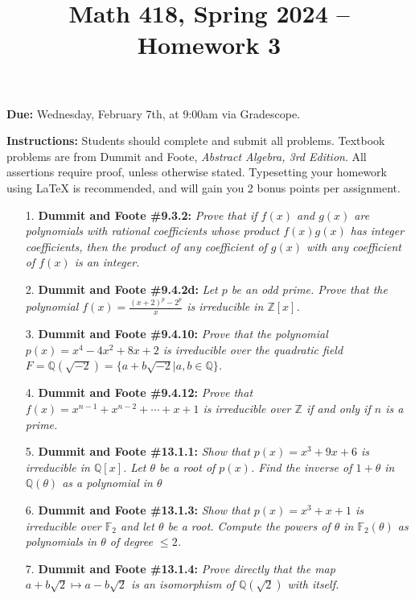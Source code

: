 \documentclass[12pt]{article}
\title{Math 418, Spring 2024 -- Homework 3}
\date{}
\newcommand{\Z}{\mathbb{Z}}
\newcommand{\Q}{\mathbb{Q}}
\newcommand{\F}{\mathbb{F}}
\begin{document}
 \maketitle
\vspace{-80pt}

\textbf{Due:} Wednesday, February 7th, at 9:00am via Gradescope.

\textbf{Instructions:} Students should complete and submit all problems. Textbook problems are from Dummit and Foote, \emph{Abstract Algebra, 3rd Edition}. All assertions require proof, unless otherwise stated. Typesetting your homework using LaTeX is recommended, and will gain you 2 bonus points per assignment.

\begin{enumerate}

\item[1.] \textbf{Dummit and Foote \#9.3.2:} \textit{Prove that if $f(x)$ and $g(x)$ are polynomials with rational coefficients whose product $f(x)g(x)$ has integer coefficients, then the product of any coefficient of $g(x)$ with any coefficient of $f(x)$ is an integer.}

\item[2.] \textbf{Dummit and Foote \#9.4.2d:} \textit{Let $p$ be an odd prime. Prove that the polynomial $f(x) = \frac{(x+2)^p - 2^p}{x}$ is irreducible in $\Z[x]$.}

\item[3.] \textbf{Dummit and Foote \#9.4.10:} \textit{Prove that the polynomial $p(x) = x^4 - 4x^2 + 8x + 2$ is irreducible over the quadratic field $F = \Q(\sqrt{-2}) = \{a + b\sqrt{-2} | a, b \in \Q\}$.}

\item[4.] \textbf{Dummit and Foote \#9.4.12:} \textit{Prove that $f(x) = x^{n-1} + x^{n-2} + \cdots + x + 1$ is irreducible over $\Z$ if and only if $n$ is a prime.}

\item[5.] \textbf{Dummit and Foote \#13.1.1:} \textit{Show that $p(x) = x^3 + 9x +6$ is irreducible in $\Q[x]$. Let $\theta$ be a root of $p(x)$. Find the inverse of $1+\theta$ in $\Q(\theta)$ as a polynomial in $\theta$}

\item[6.] \textbf{Dummit and Foote \#13.1.3:} \textit{Show that $p(x) = x^3+x+1$ is irreducible over $\F_2$ and let $\theta$ be a root. Compute the powers of $\theta$ in $\F_2(\theta)$ as polynomials in $\theta$ of degree $\le 2$.}

\item[7.] \textbf{Dummit and Foote \#13.1.4:} \textit{Prove directly that the map $a+b\sqrt{2}\mapsto a-b\sqrt{2}$ is an isomorphism of $\Q(\sqrt{2})$ with itself.}

\end{enumerate}
\end{document}

